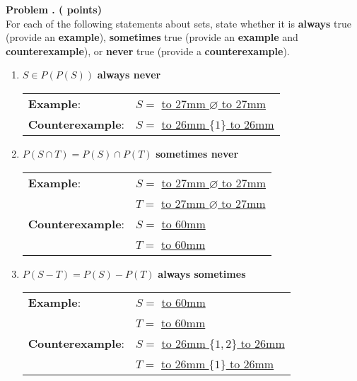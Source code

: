 
\newpage
\addtocounter{problemctr}{1}

{\bf
Problem \theproblemctr.  (\thepowersets\xspace points)}
\\

For each of the following statements about sets, 
state whether it is {\bf always} true (provide an {\bf example}),
{\bf sometimes} true (provide an {\bf example} and {\bf counterexample}), or {\bf never} true (provide a {\bf counterexample}).

\bigskip

\begin{enumerate}[label=(\arabic*),itemsep=.2in]

\item $S\in P(P(S))$
\textbf{\hfill always \quad\quad\quad {} \quad\quad\quad never}
\renewcommand{\arraystretch}{3}
\begin{tabular}{ll}
\textbf{Example}: & $S=$ \underline{\hbox to 27mm{} $\varnothing$ \hbox to 27mm{}}\\
\textbf{Counterexample}: & $S=$ \underline{\hbox to 26mm{} $\{1\}$ \hbox to 26mm{}}\\
\end{tabular}


\item $P(S\cap T) = P(S)\cap P(T)$
\textbf{\hfill {} \quad\quad\quad sometimes \quad\quad\quad never}
\renewcommand{\arraystretch}{3}
\begin{tabular}{ll}
\textbf{Example}: & $S=$ \underline{\hbox to 27mm{} $\varnothing$ \hbox to 27mm{}}\\
& $T=$ \underline{\hbox to 27mm{} $\varnothing$ \hbox to 27mm{}}\\
\textbf{Counterexample}: & $S=$ \underline{\hbox to 60mm{}}\\
& $T=$ \underline{\hbox to 60mm{}}\\
\end{tabular}


\item $P(S - T) = P(S) - P(T)$
\textbf{\hfill always \quad\quad\quad sometimes \quad\quad\quad {}}
\renewcommand{\arraystretch}{3}
\begin{tabular}{ll}
\textbf{Example}: & $S=$ \underline{\hbox to 60mm{}}\\
& $T=$ \underline{\hbox to 60mm{}}\\
\textbf{Counterexample}: & $S=$ \underline{\hbox to 26mm{} $\{1, 2\}$ \hbox to 26mm{}}\\
& $T=$ \underline{\hbox to 26mm{} $\{1\}$ \hbox to 26mm{}}\\
\end{tabular}

\end{enumerate}

